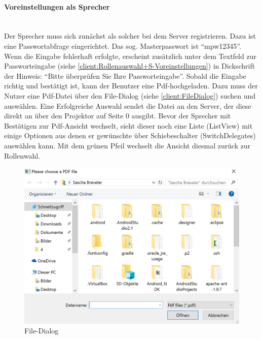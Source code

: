 \paragraph{Voreinstellungen als Sprecher}$\;$\\
Der Sprecher muss sich zunächst als solcher bei dem Server registrieren. Dazu ist eine Passwortabfrage eingerichtet. Das sog. Masterpasswort ist "`mpw12345"'. Wenn die Eingabe fehlerhaft erfolgte, erscheint zusätzlich unter dem Textfeld zur Passworteingabe (siehe \autoref{client:Rollenauswahl+S-Voreinstellungen}) in Dickschrift der Hinweis: "`Bitte überprüfen Sie Ihre Passworteingabe"'. Sobald die Eingabe richtig und bestätigt ist, kann der Benutzer eine Pdf-hochgeladen. Dazu muss der Nutzer eine Pdf-Datei über den File-Dialog (siehe \autoref{client:FileDialog}) suchen und auswählen. Eine Erfolgreiche Auswahl sendet die Datei an den Server, der diese direkt an über den Projektor auf Seite 0 ausgibt. Bevor der Sprecher mit Bestätigen zur Pdf-Ansicht wechselt, sieht dieser noch eine Liste (ListView) mit einige Optionen aus denen er gewünschte über Schiebeschalter (SwitchDelegates) auswählen kann. Mit dem grünen Pfeil wechselt die Ansicht diesmal zurück zur Rollenwahl.

\begin{figure}[ht!]
	\centering
	\includegraphics[scale=0.7]{GUI/Bilder/3-S-4-Voreinstellung.PNG}
	\caption{File-Dialog{\tiny}}
	\label{client:FileDialog}
\end{figure}

